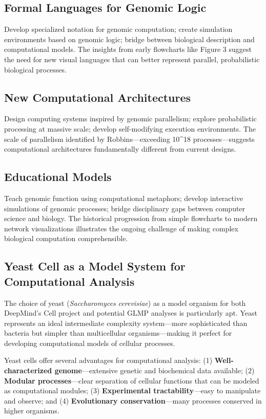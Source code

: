 \documentclass[11pt]{article}
\begin{document}
\subsection{Formal Languages for Genomic Logic}

Develop specialized notation for genomic computation; create simulation environments based on genomic logic; bridge between biological description and computational models. The insights from early flowcharts like Figure 3 suggest the need for new visual languages that can better represent parallel, probabilistic biological processes.

\subsection{New Computational Architectures}

Design computing systems inspired by genomic parallelism; explore probabilistic processing at massive scale; develop self-modifying execution environments. The scale of parallelism identified by Robbins—exceeding 10^18 processes—suggests computational architectures fundamentally different from current designs.

\subsection{Educational Models}

Teach genomic function using computational metaphors; develop interactive simulations of genomic processes; bridge disciplinary gaps between computer science and biology. The historical progression from simple flowcharts to modern network visualizations illustrates the ongoing challenge of making complex biological computation comprehensible.

\subsection{Yeast Cell as a Model System for Computational Analysis}

The choice of yeast (\textit{Saccharomyces cerevisiae}) as a model organism for both DeepMind's Cell project and potential GLMP analyses is particularly apt. Yeast represents an ideal intermediate complexity system—more sophisticated than bacteria but simpler than multicellular organisms—making it perfect for developing computational models of cellular processes.

Yeast cells offer several advantages for computational analysis: (1) \textbf{Well-characterized genome}—extensive genetic and biochemical data available; (2) \textbf{Modular processes}—clear separation of cellular functions that can be modeled as computational modules; (3) \textbf{Experimental tractability}—easy to manipulate and observe; and (4) \textbf{Evolutionary conservation}—many processes conserved in higher organisms.
\end{document}
